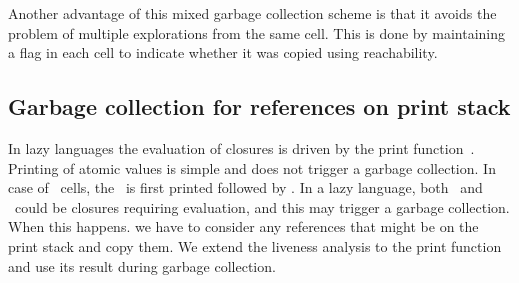 \documentclass[9pt]{sigplanconf}
\newcommand{\cred}[1]{{\color{red}{#1}}}
\begin{document}
Another advantage of  this mixed garbage collection scheme  is that it
avoids the problem of multiple  explorations from the same cell.  This
is done by maintaining a flag in  each cell to indicate whether it was
copied using reachability.


\subsection{Garbage collection for references on print stack}
In lazy  languages the evaluation of  closures is driven  by the print
function~\cite{Jones87}.  Printing of  atomic values is
simple  and  does  not  trigger  a garbage  collection.   In  case  of
\CONS\ cells, the \CAR\ is first  printed followed by \CDR.  In a lazy
language, both \CAR\ and \CDR\ could be closures requiring evaluation,
and this  may trigger  a garbage collection.   When this  happens.  we
have to consider  any references that might be on  the print stack and
copy them. We extend the liveness analysis to the print function and
use its result during garbage collection.



\end{document}
